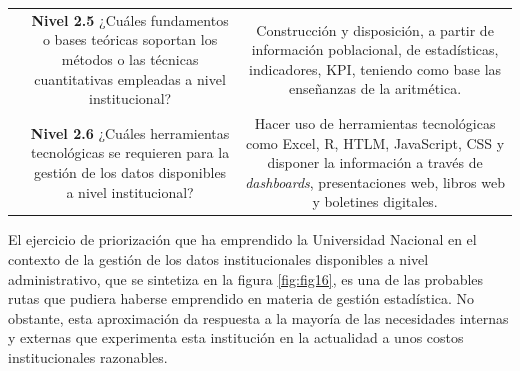 \documentclass[
]{book}
\begin{document}
\begin{longtable}[]{@{}lcc@{}}
\begin{minipage}[t]{0.04\columnwidth}
\strut
\end{minipage} & \begin{minipage}[t]{0.18\columnwidth}\centering
\textbf{Nivel 2.5} ¿Cuáles fundamentos o bases teóricas soportan los métodos o las técnicas cuantitativas empleadas a nivel institucional?\strut
\end{minipage} & \begin{minipage}[t]{0.69\columnwidth}\centering
Construcción y disposición, a partir de información poblacional, de estadísticas, indicadores, KPI, teniendo como base las enseñanzas de la aritmética.\strut
\end{minipage}\tabularnewline
\begin{minipage}[t]{0.04\columnwidth}\raggedright
\strut
\end{minipage} & \begin{minipage}[t]{0.18\columnwidth}\centering
\textbf{Nivel 2.6} ¿Cuáles herramientas tecnológicas se requieren para la gestión de los datos disponibles a nivel institucional?\strut
\end{minipage} & \begin{minipage}[t]{0.69\columnwidth}\centering
Hacer uso de herramientas tecnológicas como Excel, R, HTLM, JavaScript, CSS y disponer la información a través de \emph{dashboards}, presentaciones web, libros web y boletines digitales.\strut
\end{minipage}\tabularnewline
\bottomrule
\end{longtable}

El ejercicio de priorización que ha emprendido la Universidad Nacional en el contexto de la gestión de los datos institucionales disponibles a nivel administrativo, que se sintetiza en la figura \ref{fig:fig16}, es una de las probables rutas que pudiera haberse emprendido en materia de gestión estadística. No obstante, esta aproximación da respuesta a la mayoría de las necesidades internas y externas que experimenta esta institución en la actualidad a unos costos institucionales razonables.
\end{document}
